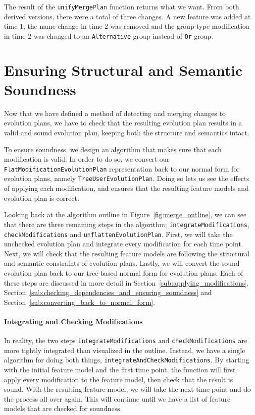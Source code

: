 \documentclass[a4paper,english]{ifimaster}
\begin{document}
The result of the \texttt{unify\-Merge\-Plan} function returns what we want. From both derived versions, there were a total of three changes. A new feature was added at time 1, the name change in time 2 was removed and the group type modification in time 2 was changed to an \texttt{Alternative} group instead of \texttt{Or} group.

\section{Ensuring Structural and Semantic Soundness}%
\label{sec:ensuring_structural_and_semantic_soundness_of_merge_result}

Now that we have defined a method of detecting and merging changes to evolution plans, we have to check that the resulting evolution plan results in a valid and sound evolution plan, keeping both the structure and semantics intact.

To ensure soundness, we design an algorithm that makes sure that each modification is valid. In order to do so, we convert our \texttt{Flat\-Modification\-Evolution\-Plan} representation back to our normal form for evolution plans, namely \texttt{Tree\-User\-Evolution\-Plan}. Doing so lets us see the effects of applying each modification, and ensures that the resulting feature models and evolution plan is correct.

Looking back at the algorithm outline in Figure~\vref{fig:merge_outline}, we can see that there are three remaining steps in the algorithm; \texttt{integrate\-Modifications}, \texttt{check\-Modifications} and \texttt{unflatten\-Evolution\-Plan}. First, we will take the unchecked evolution plan and integrate every modification for each time point. Next, we will check that the resulting feature models are following the structural and semantic constraints of evolution plans. Lastly, we will convert the sound evolution plan back to our tree-based normal form for evolution plans. Each of these steps are discussed in more detail in Section~\ref{sub:applying_modifications}, Section~\ref{sub:checking_dependencies_and_ensuring_soundness} and Section~\ref{sub:converting_back_to_normal_form}. 

\paragraph{Integrating and Checking Modifications}%
\label{par:integrating_and_checking_modifications}

In reality, the two steps \texttt{integrate\-Modifications} and \texttt{check\-Modifications} are more tightly integrated than visualized in the outline. Instead, we have a single algorithm for doing both things, \texttt{integrate\-And\-Check\-Modifications}. By starting with the initial feature model and the first time point, the function will first apply every modification to the feature model, then check that the result is sound. With the resulting feature model, we will take the next time point and do the process all over again. This will continue until we have a list of feature models that are checked for soundness.
\end{document}
